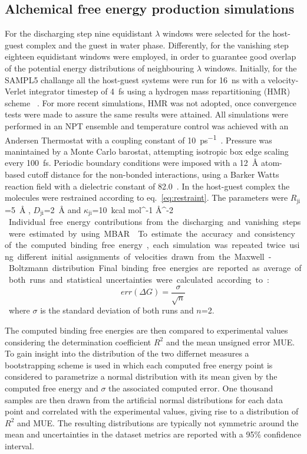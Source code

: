 \documentclass[11pt,oneside,a4paper]{article}
\begin{document}
\subsection{Alchemical free energy production simulations}
\label{sec:afesim}

For the discharging step nine equidistant $\lambda$ windows were selected for the host-guest complex and the guest in water phase. Differently, for the vanishing step eighteen equidistant windows were employed, in order to guarantee good overlap of the potential energy distributions of neighbouring $\lambda$ windows.
Initially, for the SAMPL5 challange all the host-guest systems were run for \SI{16}{ns} with a velocity-Verlet integrator timestep of \SI{4}{fs} using a hydrogen mass repartitioning (HMR) scheme ~\cite{hopkins2015long}. For more recent simulations, HMR was not adopted, once convergence tests were made to assure the same results were attained. All simulations were performed in an NPT ensemble and temperature control was achieved with an Andersen Thermostat with a coupling constant of \SI{10}{ps^{-1}}~\cite{Thermostat}. Pressure was manintained by a Monte Carlo barostat, attempting isotropic box edge scaling every \SI{100}{fs}. Periodic boundary conditions were imposed with a \SI{12}{\AA} atom-based cutoff distance for the non-bonded interactions, using a Barker Watts reaction field with a dielectric constant of 82.0~\cite{BWRF}. In the host-guest complex the molecules were restrained according to eq.~\ref{eq:restraint}. The parameters were $R_\mathrm{ji}$=\SI{5}{\AA} , $D_\mathrm{ji}$=\SI{2}{\AA} and $\kappa_\mathrm{ji}$=\SI{10}{kcal mol^{-1} \AA^{-2} }.
Individual free energy contributions from the discharging and vanishing steps were estimated by using MBAR~\cite{MBAR}. To estimate the accuracy and consistency of the computed binding free energy, each simulation was repeated twice using different initial assignments of velocities drawn from the Maxwell-Boltzmann distribution. Final binding free energies are reported as average of both runs and statistical uncertainties were calculated according to:
\begin{equation}
 \label{eq:stderr}
err(\Delta G) = \frac{\sigma}{\sqrt{n}}
\end{equation}
where $\sigma$ is the standard deviation of both runs and $n$=2.

The computed binding free energies are then compared to experimental values considering the determination coefficient $R^2$ and the mean unsigned error MUE. To gain insight into the distribution of the two differnet measures a bootstrapping scheme is used in which each computed free energy point is considered to parametrize a normal distribution with its mean given by the computed free energy and $\sigma$ the associated computed error. One thousand samples are then drawn from the artificial normal distributions for each data point and correlated with the experimental values, giving rise to a distribution of $R^2$ and MUE. The resulting distributions are typically not symmetric around the mean and uncertainties in the dataset metrics are reported with a 95$\%$ confidence interval.
\end{document}
